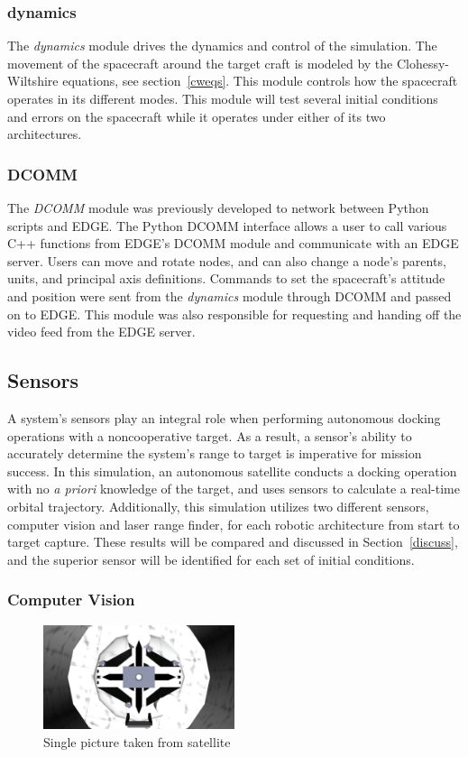 \documentclass[journal, 10pt]{IEEEtran}
\begin{document}
\subsubsection{dynamics}
The \textit{dynamics} module drives the dynamics and control of the simulation. The movement of the spacecraft around the target craft is modeled by the Clohessy-Wiltshire equations, see section~\ref{cweqs}. This module controls how the spacecraft operates in its different modes. This module will test several initial conditions and errors on the spacecraft while it operates under either of its two architectures.

\subsubsection{DCOMM}
The \textit{DCOMM} module was previously developed to network between Python scripts and EDGE. The Python DCOMM interface allows a user to call various C++ functions from EDGE's DCOMM module and communicate with an EDGE server. Users can move and rotate nodes, and can also change a node's parents, units, and principal axis definitions. Commands to set the spacecraft's attitude and position were sent from the \textit{dynamics} module through DCOMM and passed on to EDGE. This module was also responsible for requesting and handing off the video feed from the EDGE server.

\subsection{Sensors}
A system's sensors play an integral role when performing autonomous docking operations with a noncooperative target. As a result, a sensor's ability to accurately determine the system's range to target is imperative for mission success. In this simulation, an autonomous satellite conducts a docking operation with no \textit{a priori} knowledge of the target, and uses sensors to calculate a real-time orbital trajectory. Additionally, this simulation utilizes two different sensors, computer vision and laser range finder, for each robotic architecture from start to target capture. These results will be compared and discussed in Section~\ref{discuss}, and the superior sensor will be identified for each set of initial conditions. 

\subsubsection{Computer Vision} \label{cv}
\begin{figure}[tbh]
\begin{center}
\includegraphics[width=0.5\textwidth]{figures/DockingPort.pdf}
\caption{Single picture taken from satellite}
\label{docking_port}
\end{center}
\end{figure}
\end{document}

